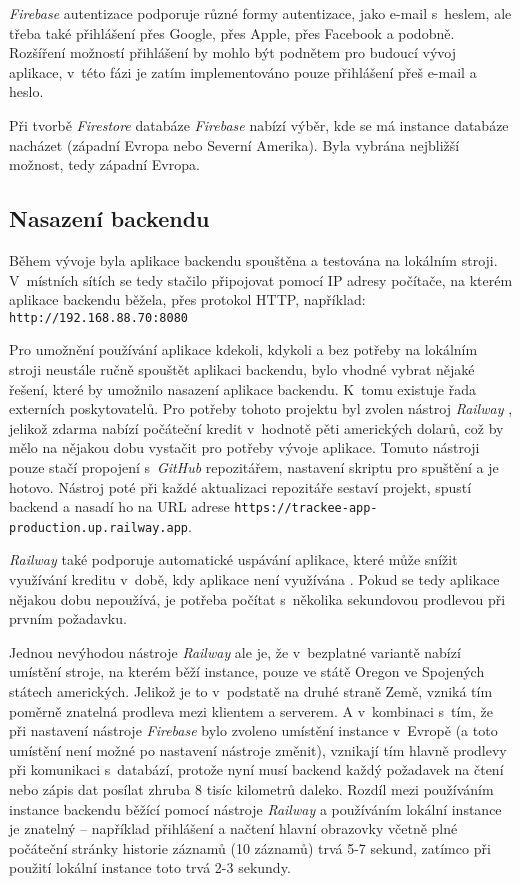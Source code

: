 \emph{Firebase} autentizace podporuje různé formy autentizace, jako e-mail s~heslem, ale třeba také přihlášení přes Google, přes Apple, přes Facebook a podobně. Rozšíření možností přihlášení by mohlo být podnětem pro budoucí vývoj aplikace, v~této fázi je zatím implementováno pouze přihlášení přeš e-mail a heslo. 

Při tvorbě \emph{Firestore} databáze \emph{Firebase} nabízí výběr, kde se má instance databáze nacházet (západní Evropa nebo Severní Amerika). Byla vybrána nejbližší možnost, tedy západní Evropa.

\subsection{Nasazení backendu}\label{backend-deployment}

Během vývoje byla aplikace backendu spouštěna a testována na lokálním stroji. V~místních sítích se tedy stačilo připojovat pomocí IP adresy počítače, na kterém aplikace backendu běžela, přes protokol HTTP, například: \texttt{http://192.168.88.70:8080}

Pro umožnění používání aplikace kdekoli, kdykoli a bez potřeby na lokálním stroji neustále ručně spouštět aplikaci backendu, bylo vhodné vybrat nějaké řešení, které by umožnilo nasazení aplikace backendu. K~tomu existuje řada externích poskytovatelů. Pro potřeby tohoto projektu byl zvolen nástroj \emph{Railway} \cite{railway}, jelikož zdarma nabízí počáteční kredit v~hodnotě pěti amerických dolarů, což by mělo na nějakou dobu vystačit pro potřeby vývoje aplikace. Tomuto nástroji pouze stačí propojení s~\emph{GitHub} repozitářem, nastavení skriptu pro spuštění a je hotovo. Nástroj poté při každé aktualizaci repozitáře sestaví projekt, spustí backend a nasadí ho na URL adrese \texttt{https://trackee-app-production.up.railway.app}. 

\emph{Railway} také podporuje automatické uspávání aplikace, které může snížit využívání kreditu v~době, kdy aplikace není využívána \cite{railway-app-sleeping}. Pokud se tedy aplikace nějakou dobu nepoužívá, je potřeba počítat s~několika sekundovou prodlevou při prvním požadavku.

Jednou nevýhodou nástroje \emph{Railway} ale je, že v~bezplatné variantě nabízí umístění stroje, na kterém běží instance, pouze ve státě Oregon ve Spojených státech amerických. Jelikož je to v~podstatě na druhé straně Země, vzniká tím poměrně znatelná prodleva mezi klientem a serverem. A v~kombinaci s~tím, že při nastavení nástroje \emph{Firebase} bylo zvoleno umístění instance v~Evropě (a toto umístění není možné po nastavení nástroje změnit), vznikají tím hlavně prodlevy při komunikaci s~databází, protože nyní musí backend každý požadavek na čtení nebo zápis dat posílat zhruba 8 tisíc kilometrů daleko. Rozdíl mezi používáním instance backendu běžící pomocí nástroje \emph{Railway} a používáním lokální instance je znatelný – například přihlášení a načtení hlavní obrazovky včetně plné počáteční stránky historie záznamů (10 záznamů) trvá 5-7 sekund, zatímco při použití lokální instance toto trvá 2-3 sekundy.

